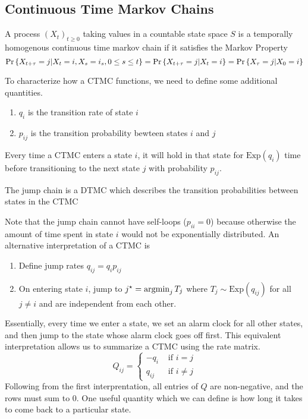 \subsection{Continuous Time Markov Chains}
\begin{definition}
	A process $(X_t)_{t\geq 0}$ taking values in a countable state space $S$ is a temporally homogenous continuous time markov chain if it satisfies the Markov Property
	\[
		\text{Pr}\left\{X_{t+\tau}=j|X_t=i,X_s=i_s, 0 \leq s \leq t\right\} = \text{Pr}\left\{X_{t+\tau}=j|X_t=i\right\} = \text{Pr}\left\{X_\tau = j | X_0 = i\right\}
	\]
	\label{defn:ctmc}
\end{definition}
To characterize how a CTMC functions, we need to define some additional quantities.
\begin{enumerate}
	\item $q_i$ is the transition rate of state $i$
	\item $p_{ij}$ is the transition probability bewteen states $i$ and $j$
\end{enumerate}
Every time a CTMC enters a state $i$, it will hold in that state for $\text{Exp}(q_i)$ time before transitioning to the next state $j$ with probability $p_{ij}$.
\begin{definition}
	The jump chain is a DTMC which describes the transition probabilities between states in the CTMC
	\label{defn:jump-chain}
\end{definition}
Note that the jump chain cannot have self-loops ($p_{ii}=0$) because otherwise the amount of time spent in state $i$ would not be exponentially distributed.
An alternative interpretation of a CTMC is
\begin{enumerate}[1.]
	\item Define jump rates $q_{ij} = q_i p_{ij}$
	\item On entering state $i$, jump to $j^\star = \operatorname*{argmin}_j T_j$ where $T_j \sim \text{Exp}(q_{ij})$ for all $j\neq i$ and are independent from each other.
\end{enumerate}
Essentially, every time we enter a state, we set an alarm clock for all other states, and then jump to the state whose alarm clock goes off first.
This equivalent interpretation allows us to summarize a CTMC using the rate matrix.
\[
	Q_{ij} = \begin{cases}
		-q_i & \text{ if } i=j\\
		q_{ij} & \text{ if } i \neq j
	\end{cases}
\]
Following from the first interprentation, all entries of $Q$ are non-negative, and the rows must sum to 0.
One useful quantity which we can define is how long it takes to come back to a particular state.
